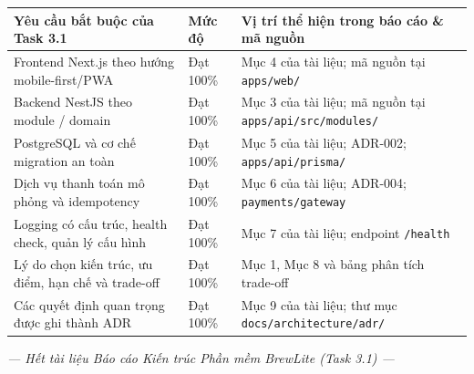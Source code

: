 \documentclass[11pt, a4paper]{article}
\begin{document}
\begin{table}[h!]
	\small
	\centering
	\begin{tabular}{p{5.5cm} p{2.2cm} p{6.5cm}}
		\toprule
		\rowcolor{tableheader}
		\textbf{Yêu cầu bắt buộc của Task 3.1}              & \textbf{Mức độ} & \textbf{Vị trí thể hiện trong báo cáo \& mã nguồn}              \\
		\midrule
		Frontend Next.js theo hướng mobile-first/PWA        & Đạt 100\%       & Mục 4 của tài liệu; mã nguồn tại \texttt{apps/web/}             \\
		Backend NestJS theo module / domain                 & Đạt 100\%       & Mục 3 của tài liệu; mã nguồn tại \texttt{apps/api/src/modules/} \\
		PostgreSQL và cơ chế migration an toàn              & Đạt 100\%       & Mục 5 của tài liệu; ADR-002; \texttt{apps/api/prisma/}          \\
		Dịch vụ thanh toán mô phỏng và idempotency          & Đạt 100\%       & Mục 6 của tài liệu; ADR-004; \texttt{payments/gateway}          \\
		Logging có cấu trúc, health check, quản lý cấu hình & Đạt 100\%       & Mục 7 của tài liệu; endpoint \texttt{/health}                   \\
		Lý do chọn kiến trúc, ưu điểm, hạn chế và trade-off & Đạt 100\%       & Mục 1, Mục 8 và bảng phân tích trade-off                        \\
		Các quyết định quan trọng được ghi thành ADR        & Đạt 100\%       & Mục 9 của tài liệu; thư mục \texttt{docs/architecture/adr/}     \\
		\bottomrule
	\end{tabular}
\end{table}

\vspace{15pt}
\begin{center}
	\itshape\color{darktext} --- Hết tài liệu Báo cáo Kiến trúc Phần mềm BrewLite (Task 3.1) ---
\end{center}
\end{document}
